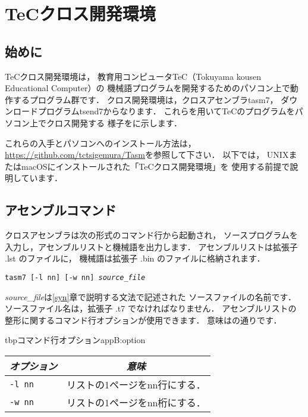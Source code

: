 \renewcommand{\myincludegraphics}[2]{\texttt{[image: appB/\#1]}}

\newpage
\chapter{TeCクロス開発環境}
\label{cross}
\section{始めに}
TeCクロス開発環境は，
教育用コンピュータTeC（Tokuyama kousen Educational Computer）の
機械語プログラムを開発するためのパソコン上で動作するプログラム群です．
クロス開発環境は，クロスアセンブラtasm7，
ダウンロードプログラムtsend7からなります．
これらを用いてTeCのプログラムをパソコン上でクロス開発する
様子をに示します．

これらの入手とパソコンへのインストール方法は，
\url{https://github.com/tctsigemura/Tasm}を参照して下さい．
以下では，
UNIXまたはmacOSにインストールされた「TeCクロス開発環境」を
使用する前提で說明しています．


\section{アセンブルコマンド}
クロスアセンブラは次の形式のコマンド行から起動され，
ソースプログラムを入力し，アセンブルリストと機械語を出力します．
アセンブルリストは拡張子 .lst のファイルに，
機械語は拡張子 .bin のファイルに格納されます．

\begin{center}
{\small\tt tasm7 [-l nn] [-w nn] {\it source\_file} }
\end{center}

{\it source\_file}は\ref{syn}章で説明する文法で記述された
ソースファイルの名前です．
ソースファイル名は，拡張子 .t7 でなければなりません．
アセンブルリストの整形に関するコマンド行オプションが使用できます．
意味はの通りです．

\begin{mytable}{tbp}{コマンド行オプション}{appB:option}
{\small\begin{tabular}{l | l} \hline\hline
\multicolumn{1}{c|}{\it オプション} & \multicolumn{1}{c}{\it 意味} \\ \hline
{\tt -l nn}  &  リストの1ページをnn行にする． \\
{\tt -w nn}  &  リストの1ページをnn桁にする．
\end{tabular}}
\end{mytable}

